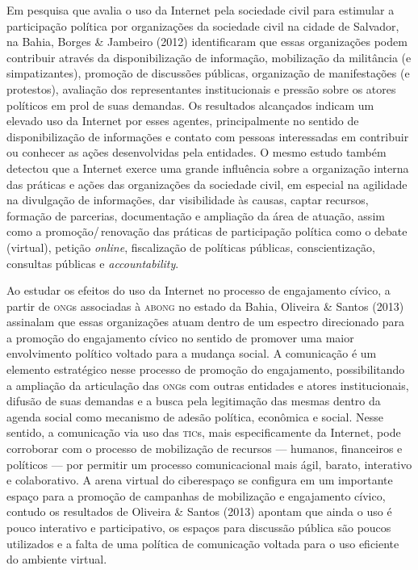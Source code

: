 Em pesquisa que avalia o uso da Internet pela sociedade civil para
estimular a participação política por organizações da sociedade civil na
cidade de Salvador, na Bahia, Borges \& Jambeiro (2012) identificaram que essas
organizações podem contribuir através da disponibilização de informação,
mobilização da militância (e simpatizantes), promoção de discussões
públicas, organização de manifestações (e protestos), avaliação dos
representantes institucionais e pressão sobre os atores políticos em
prol de suas demandas. Os resultados alcançados indicam um elevado uso
da Internet por esses agentes, principalmente no sentido de
disponibilização de informações e contato com pessoas interessadas em
contribuir ou conhecer as ações desenvolvidas pela entidades. O mesmo
estudo também detectou que a Internet exerce uma grande influência sobre
a organização interna das práticas e ações das organizações da sociedade
civil, em especial na agilidade na divulgação de informações, dar
visibilidade às causas, captar recursos, formação de parcerias,
documentação e ampliação da área de atuação, assim como a
promoção/\,renovação das práticas de participação política como o debate
(virtual), petição \textit{online}, fiscalização de políticas públicas,
conscientização, consultas públicas e \textit{accountability}.

Ao estudar os efeitos do uso da Internet no processo de engajamento
cívico, a partir de \textsc{ong}s associadas à \textsc{abong} no estado da Bahia, Oliveira
\& Santos (2013) assinalam que essas organizações atuam dentro de um
espectro direcionado para a promoção do engajamento cívico no sentido de
promover uma maior envolvimento político voltado para a mudança social.
A comunicação é um elemento estratégico nesse processo de promoção do
engajamento, possibilitando a ampliação da articulação das \textsc{ong}s com
outras entidades e atores institucionais, difusão de suas demandas e a
busca pela legitimação das mesmas dentro da agenda social como mecanismo
de adesão política, econômica e social. Nesse sentido, a comunicação via
uso das \textsc{tic}s, mais especificamente da Internet, pode corroborar com o
processo de mobilização de recursos --- humanos, financeiros e políticos --- 
por permitir um processo comunicacional mais ágil, barato, interativo e
colaborativo. A arena virtual do ciberespaço se configura em um
importante espaço para a promoção de campanhas de mobilização e
engajamento cívico, contudo os resultados de Oliveira \& Santos (2013)
apontam que ainda o uso é pouco interativo e participativo, os espaços
para discussão pública são poucos utilizados e a falta de uma política
de comunicação voltada para o uso eficiente do ambiente virtual.

